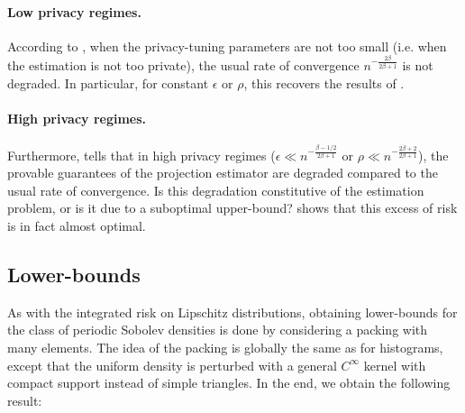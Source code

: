 \documentclass[10pt]{article} %
\begin{document}
\paragraph{Low privacy regimes.} 

According to , when the privacy-tuning parameters are not too small (i.e. when the estimation is not too private), the usual rate of convergence $n^{-\frac{2 \beta}{2 \beta + 1}}$ is not degraded. In particular, for constant $\epsilon$ or $\rho$, this recovers the results of \citet{wasserman2010statistical}.

\paragraph{High privacy regimes.}

Furthermore,  tells that in high privacy regimes ($\epsilon \ll n^{- \frac{\beta - 1/2}{2 \beta + 1}}$ or $\rho \ll n^{- \frac{2\beta +2}{2 \beta + 1}}$), the provable guarantees of the projection estimator are degraded compared to the usual rate of convergence. Is this degradation constitutive of the estimation problem, or is it due to a suboptimal upper-bound?  shows that this excess of risk is in fact almost optimal.

\subsection{Lower-bounds}

\label{sec:lbsob}

As with the integrated risk on Lipschitz distributions, obtaining lower-bounds for the class of periodic Sobolev densities is done by considering a packing with many elements. The idea of the packing is globally the same as for histograms, except that the uniform density is perturbed with a general $C^\infty$ kernel with compact support instead of simple triangles. In the end, we obtain the following result:
\end{document}
